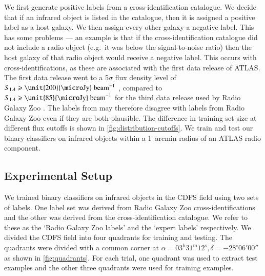 \documentclass[fleqn,usenatbib,usedcolumn]{mnras}
\newcommand{\jansky}{\text{Jy}}
\begin{document}
    We first generate positive labels from a cross-identification catalogue.
    We decide that if an infrared object is listed in the catalogue, then it
    is assigned a positive label as a host galaxy. We then assign every other galaxy a negative label. This has some problems
    --- an example is that if the cross-identification catalogue did not include a radio
    object (e.g.~it was below the signal-to-noise ratio) then the host galaxy
    of that radio object would receive a negative label. This occurs with
    \citet{norris06} cross-identifications, as these are associated with the
    first data release of ATLAS. The first data release went to a 5$\sigma$
    flux density level of $S_{1.4} \geq \unit{200}{\micro\jansky}\text{
    beam}^{-1}$ \citep{norris06}, compared to $S_{1.4} \geq \unit{85}{\micro\jansky}\text{
    beam}^{-1}$ for the third data release used by Radio Galaxy Zoo
    \citep{franzen15}. The labels from \citet{norris06} may therefore disagree with labels
    from Radio Galaxy Zoo even if they are both plausible. The difference in
    training set size at different flux cutoffs is shown in
    \autoref{fig:distribution-cutoffs}. We train and test our binary
    classifiers on infrared objects within a 1~arcmin radius of an ATLAS radio
    component.

  \subsection{Experimental Setup}
  \label{sec:experimental-setup}

    We trained binary classifiers on infrared objects in the CDFS field using
    two sets of labels. One label set was derived from Radio Galaxy Zoo
    cross-identifications and the other was derived from the \citet{norris06}
    cross-identification catalogue. We refer to these as the `Radio Galaxy Zoo
    labels' and the `expert labels' respectively. We divided the CDFS field
    into four quadrants for training and testing. The quadrants were divided
    with a common corner at $\alpha = 03^\text{h}31^\text{m}12^\text{s},
    \delta = -28^\circ{}06'00''$ as shown in \autoref{fig:quadrants}. For
    each trial, one quadrant was used to extract test examples and the other
    three quadrants were used for training examples.
\end{document}

